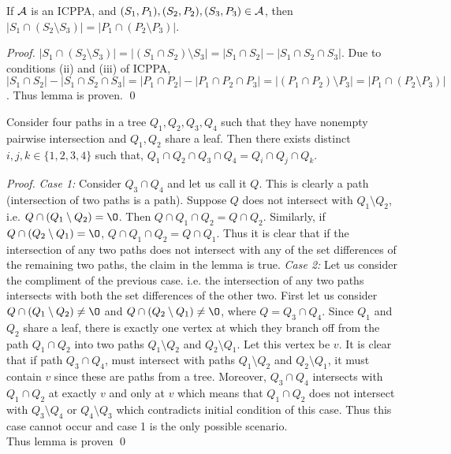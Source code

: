 \documentclass{llncs}
\def\cA{{\cal A}}
\begin{document}
\begin{lemma}
  \label{lem:setminuscard}
  If $\cA$ is an ICPPA, and $(S_1, P_1),(S_2, P_2),(S_3, P_3) \in
  \cA$, then $|S_1 \cap (S_2 \setminus S_3)| = |P_1 \cap (P_2
  \setminus P_3)|$.
\end{lemma}
\begin{proof}
  $|S_1 \cap (S_2 \setminus S_3)| = |(S_1 \cap S_2) \setminus S_3| =
  |S_1 \cap S_2| - |S_1 \cap S_2 \cap S_3|$. Due to conditions (ii)
  and (iii) of ICPPA, $|S_1 \cap S_2| - |S_1 \cap S_2 \cap S_3| = |P_1
  \cap P_2| - |P_1 \cap P_2 \cap P_3| = |(P_1 \cap P_2) \setminus P_3|
  = |P_1 \cap (P_2 \setminus P_3)|$. Thus lemma is proven. \qed
\end{proof}

\begin{lemma}
  \label{lem:fourpaths} Consider four paths in a tree $Q_1, Q_2, Q_3,
  Q_4$ such that they have nonempty pairwise intersection and $Q_1,
  Q_2$ share a leaf. Then there exists distinct $i, j, k \in
  \{1,2,3,4\}$ such that, $Q_1 \cap Q_2 \cap Q_3 \cap Q_4 = Q_i \cap
  Q_j \cap Q_k$.
\end{lemma}
\begin{proof}
  {\em Case 1:} Consider $Q_3 \cap Q_4$ and let us call it $Q$. This
  is clearly a path (intersection of two paths is a path).
  Suppose $Q$ does not intersect with $Q_1 \setminus Q_2$, i.e. $Q
  \cap (Q_1 \setminus Q_2) = \O$. Then $Q \cap Q_1 \cap Q_2 = Q \cap
  Q_2$. Similarly, if $Q \cap (Q_2 \setminus Q_1) = \O$, $Q \cap Q_1
  \cap Q_2 = Q \cap Q_1$. Thus it is clear that if the intersection of
  any two paths does not intersect with any of the set differences of
  the remaining two paths, the claim in the lemma is true.
  {\em Case 2:} Let us consider the compliment of the previous
  case. i.e. the intersection of any two paths intersects with both
  the set differences of the other two. First let us consider $Q \cap
  (Q_1 \setminus Q_2) \ne \O$ and $Q \cap (Q_2 \setminus Q_1) \ne \O$,
  where $Q = Q_3 \cap Q_4$. Since $Q_1$ and $Q_2$ share a leaf, there
  is exactly one vertex at which they branch off from the path $Q_1
  \cap Q_2$ into two paths $Q_1 \setminus Q_2$ and $Q_2 \setminus
  Q_1$. Let this vertex be $v$. It is clear that if path $Q_3 \cap
  Q_4$, must intersect with paths $Q_1 \setminus Q_2$ and $Q_2
  \setminus Q_1$, it must contain $v$ since these are paths from a
  tree. Moreover, $Q_3 \cap Q_4$ intersects with $Q_1 \cap Q_2$ at
  exactly $v$ and only at $v$ which means that $Q_1 \cap Q_2$ does not
  intersect with $Q_3 \setminus Q_4$ or $Q_4 \setminus Q_3$ which
  contradicts initial condition of this case. Thus this
  case cannot occur and case 1 is the only possible scenario. \\
  Thus lemma is proven \qed
\end{proof}
\end{document}

